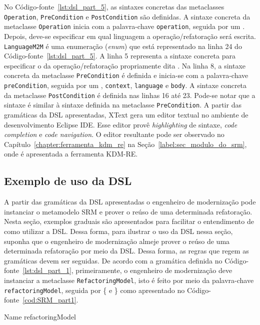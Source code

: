 No Código-fonte~\ref{lst:dsl_part_5}, as sintaxes concretas das metaclasses \texttt{Operation}, \texttt{PreCondition} e \texttt{PostCondition} são definidas. A sintaxe concreta da metaclasse \texttt{Operation} inicia com a palavra-chave \texttt{operation}, seguida por um \aspas{\{}. Depois, deve-se especificar em qual linguagem a operação/refatoração será escrita. \texttt{LanguageM2M} é uma enumeração (\textit{enum}) que está representado na linha 24 do Código-fonte~\ref{lst:dsl_part_5}. A linha 5 representa a sintaxe concreta para especificar o  da operação/refatoração propriamente dita . Na linha 8, a sintaxe concreta da metaclasse \texttt{PreCondition} é definida e inicia-se com a palavra-chave \texttt{preCondition}, seguida por um \aspas{\{}, \texttt{context}, \texttt{language} e \texttt{body}. A sintaxe concreta da metaclasse \texttt{PostCondition} é definida nas linhas 16 até 23. Pode-se notar que a sintaxe é similar à sintaxe definida na metaclasse \texttt{PreCondition}. A partir das gramáticas da DSL apresentadas, XText gera um editor textual no ambiente de desenvolvimento Eclipse IDE. Esse editor provê \textit{highlighting} de sintaxe, \textit{code completion} e \textit{code navigation}. O editor resultante pode ser observado no Capítulo~\ref{chapter:ferramenta_kdm_re} na Seção~\ref{label:sec_modulo_do_srm}, onde é apresentada a ferramenta KDM-RE.

\subsection{Exemplo de uso da DSL}

A partir das gramáticas da DSL apresentadas o engenheiro de modernização pode instanciar o metamodelo SRM e prover o reúso de uma determinada refatoração. Nesta seção, exemplos graduais são apresentados para facilitar o entendimento de como utilizar a DSL. Dessa forma, para ilustrar o uso da DSL nessa seção, suponha que o engenheiro de modernização almeje prover o reúso de uma determinada refatoração por meio da DSL. Dessa forma, as regras que regem as gramáticas devem ser seguidas. De acordo com a gramática definida no Código-fonte~\ref{lst:dsl_part_1}, primeiramente, o engenheiro de modernização deve instanciar a metaclasse \texttt{RefactoringModel}, isto é feito por meio da palavra-chave \texttt{refactoringModel}, seguida por \{ e \} como apresentado no Código-fonte~\ref{cod:SRM_part1}.

\begin{codigo}[caption={[Exemplo de uso da DSL - parte 1.] Exemplo de uso da DSL - parte 1.},escapeinside={(*@}{@*)}, basicstyle=\footnotesize, label={cod:SRM_part1}, language=myDSL]{Name}
refactoringModel {

}
\end{codigo}

